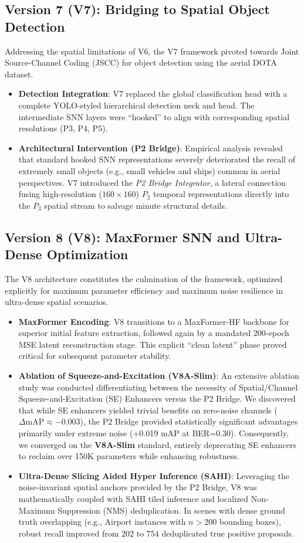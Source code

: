 \documentclass[10pt, conference]{IEEEtran}
\begin{document}
\subsection{Version 7 (V7): Bridging to Spatial Object Detection}
Addressing the spatial limitations of V6, the V7 framework pivoted towards Joint Source-Channel Coding (JSCC) for object detection using the aerial DOTA dataset.
\begin{itemize}
    \item \textbf{Detection Integration}: V7 replaced the global classification head with a complete YOLO-styled hierarchical detection neck and head. The intermediate SNN layers were ``hooked'' to align with corresponding spatial resolutions (P3, P4, P5).
    \item \textbf{Architectural Intervention (P2 Bridge)}: Empirical analysis revealed that standard hooked SNN representations severely deteriorated the recall of extremely small objects (e.g., small vehicles and ships) common in aerial perspectives. V7 introduced the \textit{P2 Bridge Integrator}, a lateral connection fusing high-resolution ($160\times 160$) $P_2$ temporal representations directly into the $P_3$ spatial stream to salvage minute structural details.
\end{itemize}

\subsection{Version 8 (V8): MaxFormer SNN and Ultra-Dense Optimization}
The V8 architecture constitutes the culmination of the framework, optimized explicitly for maximum parameter efficiency and maximum noise resilience in ultra-dense spatial scenarios.
\begin{itemize}
    \item \textbf{MaxFormer Encoding}: V8 transitions to a MaxFormer-HF backbone for superior initial feature extraction, followed again by a mandated 200-epoch MSE latent reconstruction stage. This explicit ``clean latent'' phase proved critical for subsequent parameter stability.
    \item \textbf{Ablation of Squeeze-and-Excitation (V8A-Slim)}: An extensive ablation study was conducted differentiating between the necessity of Spatial/Channel Squeeze-and-Excitation (SE) Enhancers versus the P2 Bridge. We discovered that while SE enhancers yielded trivial benefits on zero-noise channels ($\Delta \text{mAP} \approx -0.003$), the P2 Bridge provided statistically significant advantages primarily under extreme noise (+0.019 mAP at BER=0.30). Consequently, we converged on the \textbf{V8A-Slim} standard, entirely deprecating SE enhancers to reclaim over 150K parameters while enhancing robustness.
    \item \textbf{Ultra-Dense Slicing Aided Hyper Inference (SAHI)}: Leveraging the noise-invariant spatial anchors provided by the P2 Bridge, V8 was mathematically coupled with SAHI tiled inference and localized Non-Maximum Suppression (NMS) deduplication. In scenes with dense ground truth overlapping (e.g., Airport instances with $n>200$ bounding boxes), robust recall improved from $202$ to $754$ deduplicated true positive proposals.
\end{itemize}
\end{document}
